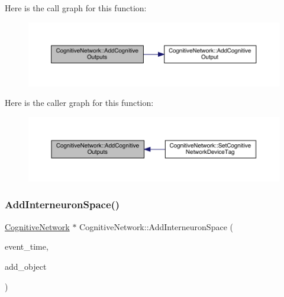 Here is the call graph for this function\+:
\nopagebreak
\begin{figure}[H]
\begin{center}
\leavevmode
\includegraphics[width=350pt]{class_cognitive_network_a6299433811b76f0ccb97cf69fe9bfb66_cgraph}
\end{center}
\end{figure}
Here is the caller graph for this function\+:
\nopagebreak
\begin{figure}[H]
\begin{center}
\leavevmode
\includegraphics[width=350pt]{class_cognitive_network_a6299433811b76f0ccb97cf69fe9bfb66_icgraph}
\end{center}
\end{figure}
\mbox{\label{class_cognitive_network_ac6a7e01f097d0cb6434eb8fa7640c214}} 
\subsubsection{\texorpdfstring{Add\+Interneuron\+Space()}{AddInterneuronSpace()}}
{\footnotesize\ttfamily \hyperlink{class_cognitive_network}{Cognitive\+Network} $\ast$ Cognitive\+Network\+::\+Add\+Interneuron\+Space (\begin{DoxyParamCaption}\item[{std\+::chrono\+::time\+\_\+point$<$ \hyperlink{universe_8h_a0ef8d951d1ca5ab3cfaf7ab4c7a6fd80}{Clock} $>$}]{event\+\_\+time,  }\item[{\hyperlink{class_cognitive_network}{Cognitive\+Network} $\ast$}]{add\+\_\+object }\end{DoxyParamCaption})}



